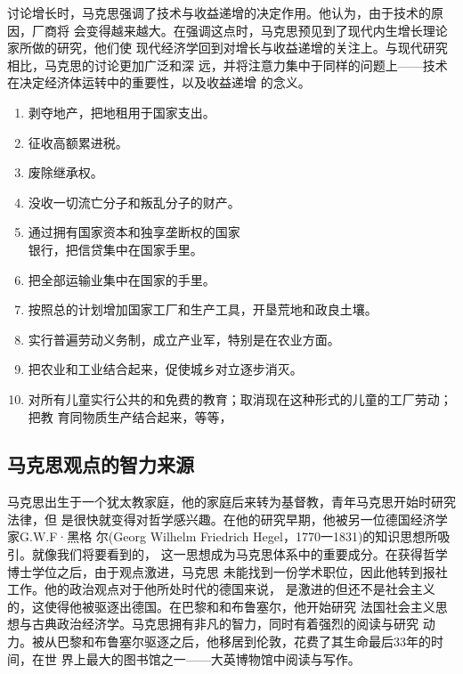讨论增长时，马克思强调了技术与收益递增的决定作用。他认为，由于技术的原因，厂商将
会变得越来越大。在强调这点时，马克思预见到了现代内生增长理论家所做的研究，他们使
现代经济学回到对增长与收益递增的关注上。与现代研究相比，马克思的讨论更加广泛和深
远，并将注意力集中于同样的问题上——技术在决定经济体运转中的重要性，以及收益递增
的念义。
\begin{tcolorbox}[title = {《共产党宣言》中的共产主义是什么样的},
  fonttitle = \sffamily\bfseries, fontupper = \small, fontlower =
  \small\itshape, left=20pt]
  \begin{multicols}{2}
    \begin{enumerate}
    \item 剥夺地产，把地租用于国家支出。
    \item 征收高额累进税。
    \item 废除继承权。
    \item 没收一切流亡分子和叛乱分子的财产。
    \item 通过拥有国家资本和独享垄断权的国家\\银行，把信贷集中在国家手里。
    \item 把全部运输业集中在国家的手里。
    \item 按照总的计划增加国家工厂和生产工具，开垦荒地和政良土壤。
    \item 实行普遍劳动义务制，成立产业军，特别是在农业方面。
    \item 把农业和工业结合起来，促使城乡对立逐步消灭。
    \item 对所有儿童实行公共的和免费的教育；取消现在这种形式的儿童的工厂劳动；把教
      育同物质生产结合起来，等等，
    \end{enumerate}
  \end{multicols}
\end{tcolorbox}


\subsection{马克思观点的智力来源}
马克思出生于一个犹太教家庭，他的家庭后来转为基督教，青年马克思开始时研究法律，但
是很快就变得对哲学感兴趣。在他的研究早期，他被另一位德国经济学家G.W.F·黑格
尔(Georg Wilhelm Friedrich Hegel，1770一1831)的知识思想所吸引。就像我们将要看到的，
这一思想成为马克思体系中的重要成分。在获得哲学博士学位之后，由于观点激进，马克思
未能找到一份学术职位，因此他转到报社工作。他的政治观点对于他所处时代的德国来说，
是激进的但还不是社会主义的，这使得他被驱逐出德国。在巴黎和和布鲁塞尔，他开始研究
法国社会主义思想与古典政治经济学。马克思拥有非凡的智力，同时有着强烈的阅读与研究
动力。被从巴黎和布鲁塞尔驱逐之后，他移居到伦敦，花费了其生命最后33年的时间，在世
界上最大的图书馆之一——大英博物馆中阅读与写作。

